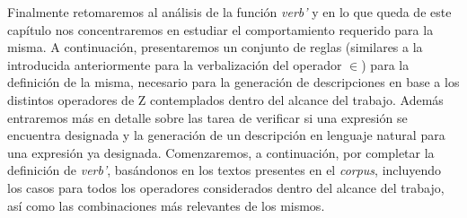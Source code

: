 Finalmente retomaremos al análisis de la función \emph{verb'} y en lo que queda de este capítulo nos concentraremos en estudiar el comportamiento requerido para la misma. A continuación, presentaremos un conjunto de reglas (similares a la introducida anteriormente para la verbalización del operador $\in$) para la definición de la misma, necesario para la generación de descripciones en base a los distintos operadores de Z contemplados dentro del alcance del trabajo. Además entraremos más en detalle sobre las tarea de verificar si una expresión se encuentra designada y la generación de un descripción en lenguaje natural para una expresión ya designada. Comenzaremos, a continuación, por completar la definición de \emph{verb'}, basándonos en los textos presentes en el \emph{corpus}, incluyendo los casos para todos los operadores considerados dentro del alcance del trabajo, así como las combinaciones más relevantes de los mismos. %

